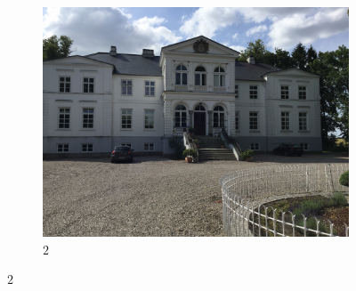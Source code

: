 \begin{figure}[h]
\begin{subfigure}[t]{.33\textwidth}
      \includegraphics[width=\textwidth]{gfx/manor_imgs/2.JPG}
      \caption{$2$}
   \end{subfigure}


\end{figure}
